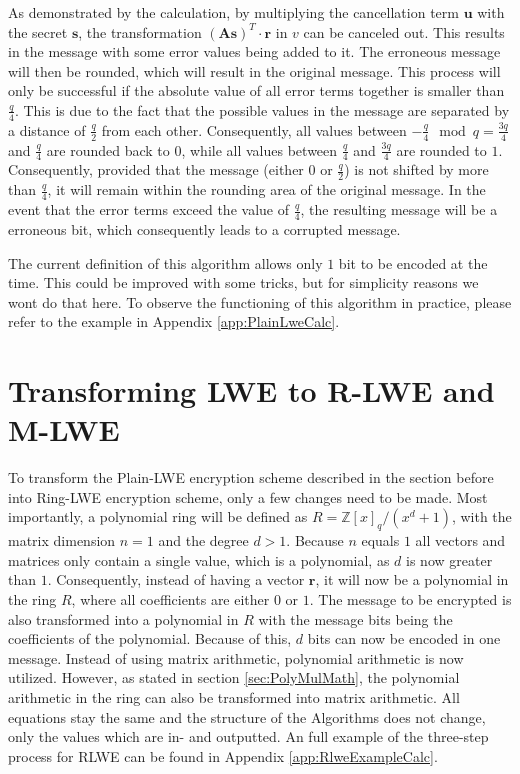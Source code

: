 As demonstrated by the calculation, by multiplying the cancellation term $\textbf{u}$ with the secret $\textbf{s}$, the transformation $(\textbf{As})^T \cdot \textbf{r}$ in $v$ can be canceled out. This results in the message with some error values being added to it. The erroneous message will then be rounded, which will result in the original message. This process will only be successful if the absolute value of all error terms together is smaller than $\frac{q}{4}$. This is due to the fact that the possible values in the message are separated by a distance of $\frac{q}{2}$ from each other. Consequently, all values between $-\frac{q}{4}\mod q=\frac{3q}{4}$ and $\frac{q}{4}$ are rounded back to $0$, while all values between $\frac{q}{4}$ and $\frac{3q}{4}$ are rounded to $1$. Consequently, provided that the message (either $0$ or $\frac{q}{2}$) is not shifted by more than $\frac{q}{4}$, it will remain within the rounding area of the original message. In the event that the error terms exceed the value of $\frac{q}{4}$, the resulting message will be a erroneous bit, which consequently leads to a corrupted message.

The current definition of this algorithm allows only $1$ bit to be encoded at the time. This could be improved with some tricks, but for simplicity reasons we wont do that here. To observe the functioning of this algorithm in practice, please refer to the example in Appendix \ref{app:PlainLweCalc}.

\section{Transforming LWE to R-LWE and M-LWE}
\label{sec:TransformingLweToRlweAndMlwe}

To transform the Plain-LWE encryption scheme described in the section before into Ring-LWE encryption scheme, only a few changes need to be made. Most importantly, a polynomial ring will be defined as $R = \mathbb{Z}[x]_q/(x^d+1)$, with the matrix dimension $n=1$ and the degree $d>1$. Because $n$ equals $1$ all vectors and matrices only contain a single value, which is a polynomial, as $d$ is now greater than $1$. Consequently, instead of having a vector $\textbf{r}$, it will now be a polynomial in the ring $R$, where all coefficients are either $0$ or $1$. The message to be encrypted is also transformed into a polynomial in $R$ with the message bits being the coefficients of the polynomial. Because of this, $d$ bits can now be encoded in one message. Instead of using matrix arithmetic, polynomial arithmetic is now utilized. However, as stated in section \ref{sec:PolyMulMath}, the polynomial arithmetic in the ring can also be transformed into matrix arithmetic. All equations stay the same and the structure of the Algorithms does not change, only the values which are in- and outputted. An full example of the three-step process for RLWE can be found in Appendix \ref{app:RlweExampleCalc}.

